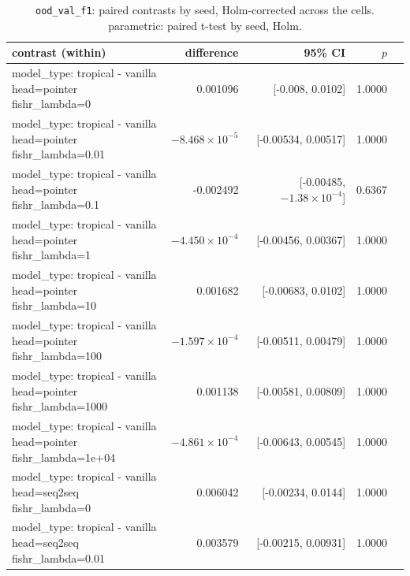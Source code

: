 \documentclass[10pt]{article}
\makeatletter
\newcommand{\stackcell}[1]{\begin{tabular}[t]{@{}l@{}}#1\end{tabular}}
\makeatother
\begin{document}
{\small
\begin{longtable}{lrrrl}
\caption{\texttt{ood\_val\_f1}: paired contrasts by seed, Holm-corrected across the cells. parametric: paired t-test by seed, Holm.}\label{tab:paired-ood_val_f1}\\
\toprule
contrast (within) & difference & 95\% CI & $p$ & \\
\midrule
\endhead
\stackcell{model\_type: tropical - vanilla\\\footnotesize head=pointer fishr\_lambda=0 } & 0.001096 & [-0.008, 0.0102] & 1.0000 & \\
\stackcell{model\_type: tropical - vanilla\\\footnotesize head=pointer fishr\_lambda=0.01 } & $-8.468\times10^{-5}$ & [-0.00534, 0.00517] & 1.0000 & \\
\stackcell{model\_type: tropical - vanilla\\\footnotesize head=pointer fishr\_lambda=0.1 } & -0.002492 & [-0.00485, $-1.38\times10^{-4}$] & 0.6367 & \\
\stackcell{model\_type: tropical - vanilla\\\footnotesize head=pointer fishr\_lambda=1 } & $-4.450\times10^{-4}$ & [-0.00456, 0.00367] & 1.0000 & \\
\stackcell{model\_type: tropical - vanilla\\\footnotesize head=pointer fishr\_lambda=10 } & 0.001682 & [-0.00683, 0.0102] & 1.0000 & \\
\stackcell{model\_type: tropical - vanilla\\\footnotesize head=pointer fishr\_lambda=100 } & $-1.597\times10^{-4}$ & [-0.00511, 0.00479] & 1.0000 & \\
\stackcell{model\_type: tropical - vanilla\\\footnotesize head=pointer fishr\_lambda=1000 } & 0.001138 & [-0.00581, 0.00809] & 1.0000 & \\
\stackcell{model\_type: tropical - vanilla\\\footnotesize head=pointer fishr\_lambda=1e+04 } & $-4.861\times10^{-4}$ & [-0.00643, 0.00545] & 1.0000 & \\
\stackcell{model\_type: tropical - vanilla\\\footnotesize head=seq2seq fishr\_lambda=0 } & 0.006042 & [-0.00234, 0.0144] & 1.0000 & \\
\stackcell{model\_type: tropical - vanilla\\\footnotesize head=seq2seq fishr\_lambda=0.01 } & 0.003579 & [-0.00215, 0.00931] & 1.0000 & \\

\end{longtable}}
\end{document}
